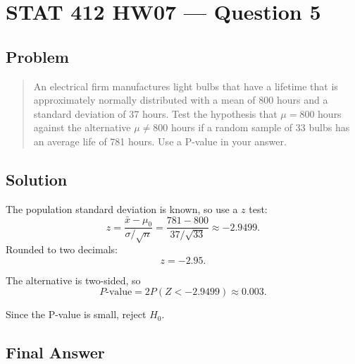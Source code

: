 \documentclass[11pt]{article}
\begin{document}
\section*{STAT 412 HW07 --- Question 5}

\subsection*{Problem}

\begin{quote}
An electrical firm manufactures light bulbs that have a lifetime that is approximately normally distributed with a mean of 800 hours and a standard deviation of 37 hours. Test the hypothesis that $\mu=800$ hours against the alternative $\mu\ne800$ hours if a random sample of 33 bulbs has an average life of 781 hours. Use a P-value in your answer.
\end{quote}

\subsection*{Solution}

The population standard deviation is known, so use a $z$ test:
\[
z=\frac{\bar{x}-\mu_0}{\sigma/\sqrt{n}}
  =\frac{781-800}{37/\sqrt{33}}
  \approx -2.9499.
\]
Rounded to two decimals:
\[
z=-2.95.
\]

The alternative is two-sided, so
\[
P\text{-value}=2P(Z<-2.9499)\approx 0.003.
\]

Since the P-value is small, reject $H_0$.

\subsection*{Final Answer}

\end{document}
